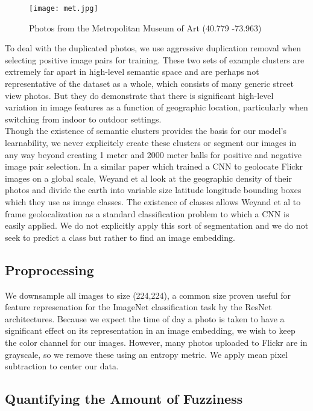 \documentclass[pageno]{jpaper}
\begin{document}
\begin{figure}[!htbp]
  \centering
  \texttt{[image: met.jpg]}
  \caption{Photos from the Metropolitan Museum of Art (40.779 -73.963)}
  \label{fig:met}
\end{figure}

To deal with the duplicated photos, we use aggressive duplication removal when selecting positive image pairs for training. These two sets of example clusters are extremely far apart in high-level semantic space and are perhaps not representative of the dataset as a whole, which consists of many generic street view photos. But they do demonstrate that there is significant high-level variation in image features as a function of geographic location, particularly when switching from indoor to outdoor settings.\\

Though the existence of semantic clusters provides the basis for our model's learnability, we never explicitely create these clusters or segment our images in any way beyond creating 1 meter and 2000 meter balls for positive and negative image pair selection. In a similar paper which trained a CNN to geolocate Flickr images on a global scale, Weyand et al look at the geographic density of their photos and divide the earth into variable size latitude longitude bounding boxes which they use as image classes.\cite{weyand2016planet} The existence of classes allows Weyand et al to frame geolocalization as a standard classification problem to which a CNN is easily applied. We do not explicitly apply this sort of segmentation and we do not seek to predict a class but rather to find an image embedding.

\subsection{Proprocessing}
We downsample all images to size (224,224), a common size proven useful for feature represenation for the ImageNet classification task by the ResNet architectures.\cite{He2015} Because we expect the time of day a photo is taken to have a significant effect on its representation in an image embedding, we wish to keep the color channel for our images. However, many photos uploaded to Flickr are in grayscale, so we remove these using an entropy metric. We apply mean pixel subtraction to center our data.

\subsection{Quantifying the Amount of Fuzziness}
\end{document}
